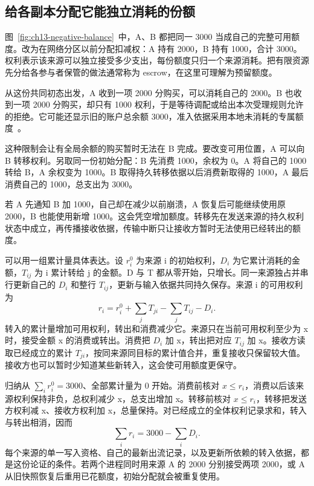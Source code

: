 \subsection*{给各副本分配它能独立消耗的份额}

图~\ref{fig:ch13-negative-balance}~中，A、B 都把同一 3000 当成自己的完整可用额度。改为在网络分区以前分配扣减权：A 持有 2000，B 持有 1000，合计 3000。权利表示该来源可以独立接受多少支出，每份额度只归一个来源消耗。把有限资源先分给各参与者保管的做法通常称为 escrow，在这里可理解为预留额度。

从这份共同初态出发，A 收到一项 2000 分购买，可以消耗自己的 2000。B 也收到一项 2000 分购买，却只有 1000 权利，于是等待调配或给出本次受理规则允许的拒绝。它可能还显示旧的账户总余额 3000，准入依据采用本地未消耗的专属额度~\cite{preguica2018crdt}。

这种限制会让有全局余额的购买暂时无法在 B 完成。要改变可用位置，A 可以向 B 转移权利。另取同一份初始分配：B 先消费 1000，余权为 0。A 将自己的 1000 转给 B，A 余权变为 1000。B 取得持久转移依据以后消费新取得的 1000，A 最后消费自己的 1000，总支出为 3000。


若 A 先通知 B 加 1000，自己却在减少以前崩溃，A 恢复后可能继续使用原 2000，B 也能使用新增 1000。这会凭空增加额度。转移先在发送来源的持久权利状态中成立，再传播接收依据，传输中断只让接收方暂时无法使用已经转出的额度。

可以用一组累计量具体表达。设 $r_i^0$ 为来源 i 的初始权利，$D_i$ 为它累计消耗的金额，$T_{ij}$ 为 i 累计转给 j 的金额。D 与 T 都从零开始，只增长。同一来源独占并串行更新自己的 $D_i$ 和整行 $T_{ij}$，更新与输入依据共同持久保存。来源 i 的可用权利为
\[
  r_i=r_i^0+\sum_jT_{ji}-\sum_jT_{ij}-D_i.
\]
转入的累计量增加可用权利，转出和消费减少它。来源只在当前可用权利至少为 x 时，接受金额 x 的消费或转出。消费把 $D_i$ 加 x，转出把对应 $T_{ij}$ 加 x。接收方读取已经成立的累计 $T_{ji}$，按同来源同目标的累计值合并，重复接收只保留较大值。接收方也可以暂时少知道某些新转入，这会使可用额度更保守。

归纳从 $\sum_i r_i^0=3000$、全部累计量为 0 开始。消费前核对 $x\le r_i$，消费以后该来源权利保持非负，总权利减少 x，总支出增加 x。转移前核对 $x\le r_i$，转移把发送方权利减 x、接收方权利加 x，总量保持。对已经成立的全体权利记录求和，转入与转出相消，因而
\[
  \sum_i r_i=3000-\sum_i D_i.
\]
每个来源的单一写入资格、自己的最新出流记录，以及更新所依赖的转入依据，都是这份论证的条件。若两个进程同时用来源 A 的 2000 分别接受两项 2000，或 A 从旧快照恢复后重用已花额度，初始分配就会被重复使用。

